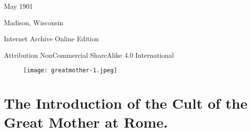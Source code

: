 \documentclass[a4paper, 11pt, oneside, polutonikogreek, english]{article}
\begin{document}
\begin{titlepage}
	
		
	\vspace*{\fill}%
	
	May 1901  %
	
	{\small Madison, Wisconsin } %

	\vspace{1\baselineskip} %

        Internet Archive Online Edition  %
	
	{\small Attribution NonCommercial ShareAlike 4.0 International } %
\end{titlepage}
\clearpage
\pagestyle{fancy}
\fancyhf{}
\cfoot{\Fontauri{\thepage}}
\Large
\setlength{\parskip}{1mm plus1mm minus1mm}
\tableofcontents
\clearpage
\begin{figure}[H]
\centering
\texttt{[image: greatmother-1.jpeg]}
\caption{}
\end{figure}
\clearpage
\section{The Introduction of the Cult of the Great Mother at Rome.}
\end{document}
